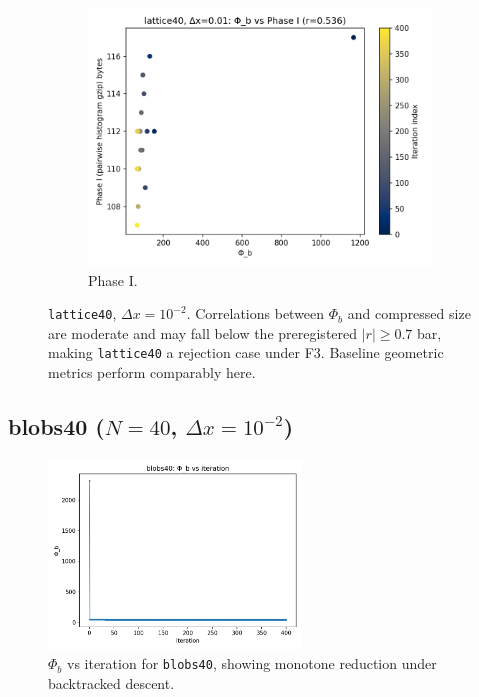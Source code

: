 \documentclass[11pt,a4paper]{article}
\numberwithin{equation}{section}
\newcommand{\phib}{\Phi_b}
\begin{document}
\begin{figure}[h!]
\begin{subfigure}[b]{0.32\textwidth}
\includegraphics[width=\textwidth]{figures/lattice40_dx0.01_phib_vs_phase1.png}
\caption{Phase I.}
\end{subfigure}
\caption{\texttt{lattice40}, $\Delta x{=}10^{-2}$. Correlations between $\phib$ and compressed size are moderate and may fall below the preregistered $|r|\ge0.7$ bar, making \texttt{lattice40} a rejection case under F3. Baseline geometric metrics perform comparably here.}
\label{fig:lattice40_corr}
\end{figure}

\subsection{blobs40 ($N{=}40$, $\Delta x = 10^{-2}$)}
\begin{figure}[h!]
\centering
\includegraphics[width=0.6\textwidth]{figures/blobs40_dx0.01_phib_vs_iter.png}
\caption{$\phib$ vs iteration for \texttt{blobs40}, showing monotone reduction under backtracked descent.}
\label{fig:blobs40_iter}
\end{figure}
\end{document}
